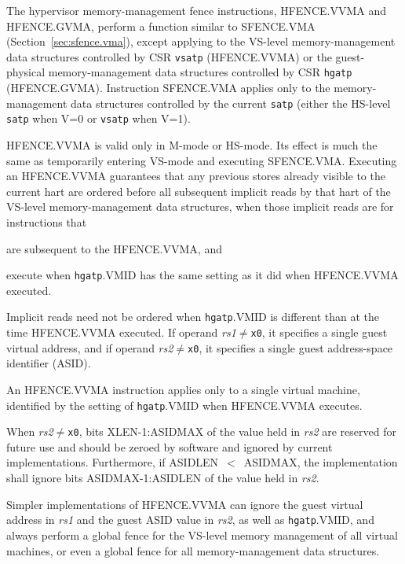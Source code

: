 The hypervisor memory-management fence instructions, HFENCE.VVMA
and HFENCE.GVMA, perform a function similar to SFENCE.VMA
(Section~\ref{sec:sfence.vma}), except applying to the VS-level
memory-management data structures controlled by CSR {\tt vsatp}
(HFENCE.VVMA) or the guest-physical memory-management data structures
controlled by CSR {\tt hgatp} (HFENCE.GVMA).
Instruction SFENCE.VMA applies only to the memory-management data structures
controlled by the current {\tt satp} (either the HS-level {\tt satp} when
V=0 or {\tt vsatp} when V=1).

HFENCE.VVMA is valid only in M-mode or HS-mode.
Its effect is much the
same as temporarily entering VS-mode and executing SFENCE.VMA.
Executing an HFENCE.VVMA guarantees that any previous stores already visible
to the current hart are ordered before all subsequent implicit reads by that
hart of the VS-level memory-management data structures, when those implicit
reads are for instructions that
\begin{compactitem}
\item
are subsequent to the HFENCE.VVMA, and
\item
execute when {\tt hgatp}.VMID has the same setting as it did when HFENCE.VVMA
executed.
\end{compactitem}
Implicit reads need not be ordered when {\tt hgatp}.VMID is different than at
the time HFENCE.VVMA executed.
If operand {\em rs1}$\neq${\tt x0}, it specifies a single guest virtual
address, and if operand {\em rs2}$\neq${\tt x0}, it specifies a single guest
address-space identifier
(ASID).

\begin{commentary}
An HFENCE.VVMA instruction applies only to a single virtual machine, identified
by the setting of {\tt hgatp}.VMID when HFENCE.VVMA executes.
\end{commentary}

When {\em rs2}$\neq${\tt x0}, bits XLEN-1:ASIDMAX of the value held in {\em
rs2} are reserved for future use and should be zeroed by software and ignored
by current implementations.
Furthermore, if ASIDLEN~$<$~ASIDMAX, the implementation shall ignore bits
ASIDMAX-1:ASIDLEN of the value held in {\em rs2}.

\begin{commentary}
Simpler implementations of HFENCE.VVMA can ignore the guest virtual address in
{\em rs1} and the guest ASID value in {\em rs2}, as well as {\tt hgatp}.VMID,
and always perform a global fence for the VS-level memory management of all
virtual machines, or even a global fence for all memory-management data
structures.
\end{commentary}

